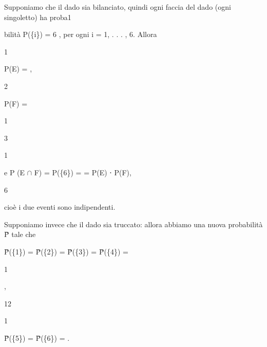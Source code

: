 \documentclass[a4paper,portrait,12pt]{article}
\begin{document}
\begin{flushleft}
Supponiamo che il dado sia bilanciato, quindi ogni faccia del dado (ogni singoletto) ha proba1
\end{flushleft}


\begin{flushleft}
bilit\`{a} P(\{i\}) = 6 , per ogni i = 1, . . . , 6. Allora
\end{flushleft}


1


\begin{flushleft}
P(E) = ,
\end{flushleft}


2





\begin{flushleft}
P(F) =
\end{flushleft}





1


3





1


\begin{flushleft}
e P (E $\cap$ F) = P(\{6\}) = = P(E) ⋅ P(F),
\end{flushleft}


6





\begin{flushleft}
cio\`{e} i due eventi sono indipendenti.
\end{flushleft}


\begin{flushleft}
Supponiamo invece che il dado sia truccato: allora abbiamo una nuova probabilit\`{a} P̃ tale che
\end{flushleft}


\begin{flushleft}
P̃(\{1\}) = P̃(\{2\}) = P̃(\{3\}) = P̃(\{4\}) =
\end{flushleft}





1


,


12





1


\begin{flushleft}
P̃(\{5\}) = P̃(\{6\}) = .
\end{flushleft}
\end{document}
